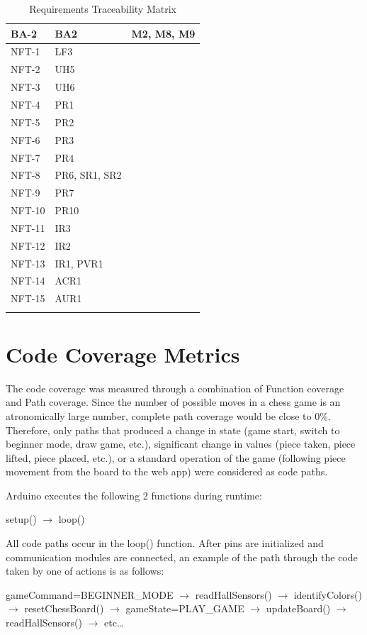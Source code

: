 \documentclass[12pt, titlepage]{article}
\begin{document}
\begin{longtable}{| p{} | p{} | p{}|}
  \hline
  BA-2 & BA2 & M2, M8, M9\\
  \hline
  NFT-1 & LF3 &\\
  \hline
  NFT-2 & UH5 &\\
  \hline
  NFT-3 & UH6 &\\
  \hline
  NFT-4 & PR1 &\\
  \hline
  NFT-5 & PR2 &\\
  \hline
  NFT-6 & PR3 &\\
  \hline
  NFT-7 & PR4 &\\
  \hline
  NFT-8 & PR6, SR1, SR2\\
  \hline
  NFT-9 & PR7\\
  \hline
  NFT-10 & PR10\\
  \hline
  NFT-11 & IR3\\
  \hline
  NFT-12 & IR2\\
  \hline
  NFT-13 & IR1, PVR1\\
  \hline
  NFT-14 & ACR1\\
  \hline
  NFT-15 & AUR1\\
  \hline
\caption{Requirements Traceability Matrix}
\end{longtable}
		
\section{Code Coverage Metrics}

The code coverage was measured through a combination of Function coverage and Path coverage. Since the number of possible moves in a chess game is an 
atronomically large number, complete path coverage would be close to 0\%. Therefore, only paths that produced a change in state (game start, switch to beginner
mode, draw game, etc.), significant change in values (piece taken, piece lifted, piece placed, etc.), or a standard operation of the game (following piece movement
from the board to the web app) were considered as code paths.

Arduino executes the following 2 functions during runtime:

\begin{center}
  setup() $\rightarrow$ loop()
\end{center}

All code paths occur in the loop() function. After pins are initialized and communication modules are connected, an example of the path through the
code taken by one of actions is as follows:

\begin{center}
  gameCommand=BEGINNER\_MODE $\rightarrow$ readHallSensors() $\rightarrow$ identifyColors() $\rightarrow$ resetChessBoard() 
  $\rightarrow$ gameState=PLAY\_GAME $\rightarrow$ updateBoard() $\rightarrow$ readHallSensors() $\rightarrow$ etc\dots
\end{center}
\end{document}
